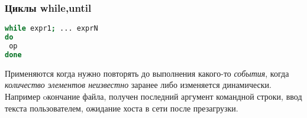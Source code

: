 \begin{frame}[fragile]
\frametitle{Циклы while,until}
\begin{lstlisting}[language=sh,frame=single]
while expr1; ... exprN
do
 op
done
\end{lstlisting}
Применяются когда нужно повторять до выполнения какого-то  {\it события}, когда {\it количество элементов неизвестно} заранее либо изменяется динамически. \\
Например oкончание файла, получен последний аргумент командной строки, ввод текста пользователем, ожидание хоста в сети после презагрузки. 
\end{frame}
